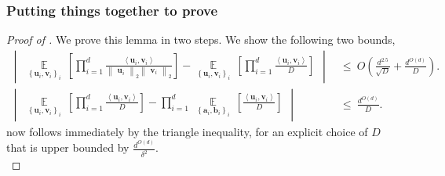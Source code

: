 \documentclass[11pt]{article}
\newcommand{\inbrace}[1]{\left \{ #1 \right \}}
\newcommand{\inparen}[1]{\left ( #1 \right )}
\newcommand{\insquare}[1]{\left [ #1 \right ]}
\newcommand{\inangle}[1]{\left \langle #1 \right \rangle}
\newcommand{\inabs}[1]{\begin{vmatrix} #1 \end{vmatrix}}
\newcommand{\norm}[2]{\begin{Vmatrix} #2 \end{Vmatrix}_{#1}}
\newcommand{\set}[1]{\inbrace{#1}}
\DeclareMathOperator*{\Ex}{\mathbb{E}}
\newcommand{\ba}{{\bm a}}
\newcommand{\bb}{{\bm b}}
\newcommand{\bu}{{\bm u}}
\newcommand{\bv}{{\bm v}}
\begin{document}
\subsubsection*{Putting things together to prove }

\begin{proof}[Proof of ]
	We prove this lemma in two steps. We show the following two bounds,
	\begin{align}
	\inabs{\Ex\limits_{\set{\bu_i, \bv_i}_i} \ \insquare{\prod_{i=1}^d \frac{\inangle{\bu_i, \bv_i}}{\norm{2}{\bu_i} \norm{2}{\bv_i}}} - \Ex\limits_{\set{\bu_i, \bv_i}_i} \ \insquare{\prod_{i=1}^d \frac{\inangle{\bu_i, \bv_i}}{D}}} &~\le~ O\inparen{\frac{d^{2.5}}{\sqrt{D}} + \frac{d^{O(d)}}{D}}. \label{eq:norm_ineq_norms}\\
	\inabs{\Ex\limits_{\set{\bu_i, \bv_i}_i} \ \insquare{\prod_{i=1}^d \frac{\inangle{\bu_i, \bv_i}}{D}} - \prod_{i=1}^d \ \Ex\limits_{\set{\ba_i, \bb_i}_i} \ \insquare{\frac{\inangle{\bu_i, \bv_i}}{D}}} &~\le~ \frac{d^{O(d)}}{D}.\label{eq:unorm_ineq_norms}
	\end{align}
	 now follows immediately by the triangle inequality, for an explicit choice of $D$ that is upper bounded by $\frac{d^{O(d)}}{\delta^2}$.\\
	

\end{proof}
\end{document}
